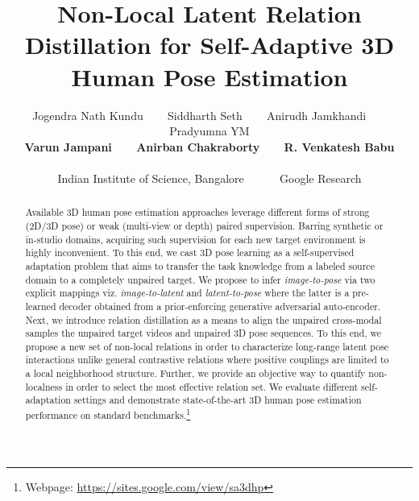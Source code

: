 \documentclass{article}
\title{Non-Local Latent Relation Distillation for Self-Adaptive 3D Human Pose Estimation}
\author{Jogendra Nath Kundu ~~~ Siddharth Seth ~~~ Anirudh Jamkhandi ~~~ Pradyumna YM \\
\textbf{Varun Jampani} ~~~ \textbf{Anirban Chakraborty} ~~~ \textbf{R. Venkatesh Babu}  \\ \\
Indian Institute of Science, Bangalore  ~~~~~ Google Research
}
\begin{document}
\maketitle
\vspace{-2mm}
\begin{abstract}



Available 3D human pose estimation approaches leverage different forms of strong (2D/3D pose) or weak (multi-view or depth) paired supervision. Barring synthetic or in-studio domains, acquiring such supervision for each new target environment is highly inconvenient. To this end, we cast 3D pose learning as a self-supervised adaptation problem that aims to transfer the task knowledge from a labeled source domain to a completely unpaired target. We propose to infer \textit{image-to-pose} via two explicit mappings viz. \textit{image-to-latent} and \textit{latent-to-pose} where the latter is a pre-learned decoder obtained from a prior-enforcing generative adversarial auto-encoder. Next, we introduce relation distillation as a means to align the unpaired cross-modal samples \ie the unpaired target videos and unpaired 3D pose sequences. To this end, we propose a new set of non-local relations in order to characterize long-range latent pose interactions unlike general contrastive relations where positive couplings are limited to a local neighborhood structure. Further, we provide an objective way to quantify non-localness in order to select the most effective relation set. We evaluate different self-adaptation settings and demonstrate state-of-the-art 3D human pose estimation performance on standard benchmarks.\footnote{Webpage: \url{https://sites.google.com/view/sa3dhp}}



\end{abstract}
\end{document}

